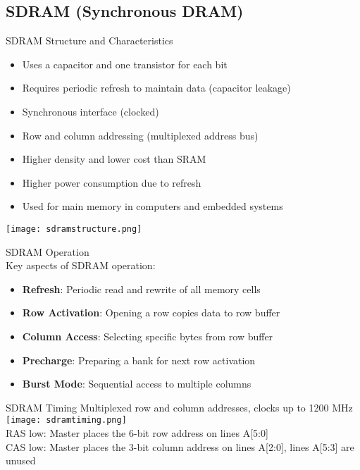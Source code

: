 \subsection{SDRAM (Synchronous DRAM)}



\begin{concept}{SDRAM Structure and Characteristics}
\begin{itemize}
    \item Uses a capacitor and one transistor for each bit
    \item Requires periodic refresh to maintain data (capacitor leakage)
    \item Synchronous interface (clocked)
    \item Row and column addressing (multiplexed address bus)
    \item Higher density and lower cost than SRAM
    \item Higher power consumption due to refresh
    \item Used for main memory in computers and embedded systems
\end{itemize}

\texttt{[image: sdramstructure.png]}
\end{concept}

\begin{definition}{SDRAM Operation}\\
Key aspects of SDRAM operation:
\begin{itemize}
    \item \textbf{Refresh}: Periodic read and rewrite of all memory cells
    \item \textbf{Row Activation}: Opening a row copies data to row buffer
    \item \textbf{Column Access}: Selecting specific bytes from row buffer
    \item \textbf{Precharge}: Preparing a bank for next row activation
    \item \textbf{Burst Mode}: Sequential access to multiple columns
\end{itemize}
\end{definition}


\begin{theorem}{SDRAM Timing} Multiplexed row and column addresses, clocks up to 1200 MHz\\
    \texttt{[image: sdramtiming.png]}\\
    RAS low: Master places the 6-bit row address on lines A[5:0]\\
    CAS low: Master places the 3-bit column address on lines A[2:0], lines A[5:3] are unused
\end{theorem}

